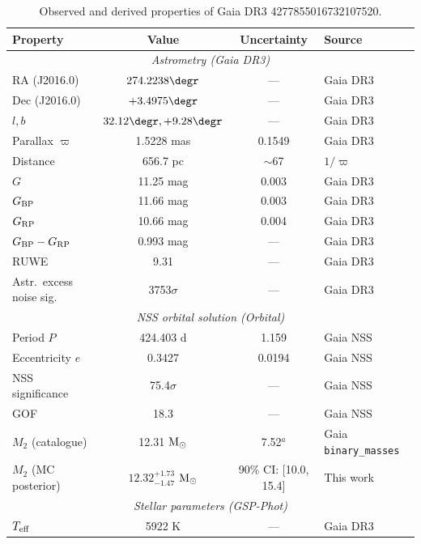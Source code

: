 \documentclass[usenatbib,fleqn]{mnras}
\newcommand{\Msun}{{\rm M}_\odot}
\begin{document}
\begin{table}
\centering
\caption{Observed and derived properties of
Gaia DR3 4277855016732107520.}
\label{tab:observed}
\begin{tabular}{lccl}
\toprule
Property & Value & Uncertainty & Source \\
\midrule
\multicolumn{4}{c}{\textit{Astrometry (Gaia DR3)}} \\
RA (J2016.0)           & $274.2238\degr$     & ---      & Gaia DR3 \\
Dec (J2016.0)          & $+3.4975\degr$      & ---      & Gaia DR3 \\
$l, b$                 & $32.12\degr, +9.28\degr$ & --- & Gaia DR3 \\
Parallax $\varpi$      & 1.5228 mas          & 0.1549   & Gaia DR3 \\
Distance               & 656.7 pc            & $\sim$67 & $1/\varpi$ \\
$G$                    & 11.25 mag           & 0.003    & Gaia DR3 \\
$G_{\rm BP}$           & 11.66 mag           & 0.003    & Gaia DR3 \\
$G_{\rm RP}$           & 10.66 mag           & 0.004    & Gaia DR3 \\
$G_{\rm BP} - G_{\rm RP}$ & 0.993 mag        & ---      & Gaia DR3 \\
RUWE                   & 9.31                & ---      & Gaia DR3 \\
Astr.\ excess noise sig.\ & 3753$\sigma$     & ---      & Gaia DR3 \\
\midrule
\multicolumn{4}{c}{\textit{NSS orbital solution (Orbital)}} \\
Period $P$             & 424.403 d           & 1.159    & Gaia NSS \\
Eccentricity $e$       & 0.3427              & 0.0194   & Gaia NSS \\
NSS significance       & 75.4$\sigma$        & ---      & Gaia NSS \\
GOF                    & 18.3                & ---      & Gaia NSS \\
$M_2$ (catalogue)      & 12.31 $\Msun$       & 7.52$^a$ & Gaia \texttt{binary\_masses} \\
$M_2$ (MC posterior)   & $12.32^{+1.73}_{-1.47}$ $\Msun$ & 90\% CI: [10.0, 15.4] & This work \\
\midrule
\multicolumn{4}{c}{\textit{Stellar parameters (GSP-Phot)}} \\
$T_{\rm eff}$          & 5922 K              & ---      & Gaia DR3 \\

\end{tabular}
\end{table}
\end{document}
